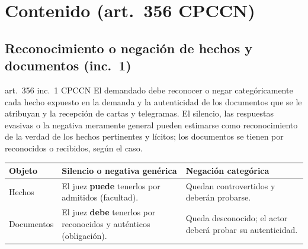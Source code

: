 \documentclass[12pt,oneside]{book}
\renewcommand{\arraystretch}{1.15}
\begin{document}
\section{Contenido (art.~356 CPCCN)}

\subsection{Reconocimiento o negación de hechos y documentos (inc.~1)}

\begin{norma}{art.~356 inc.~1 CPCCN}
El demandado debe reconocer o negar categóricamente cada hecho expuesto en la demanda y la autenticidad de los documentos que se le atribuyan y la recepción de cartas y telegramas. El silencio, las respuestas evasivas o la negativa meramente general pueden estimarse como reconocimiento de la verdad de los hechos pertinentes y lícitos; los documentos se tienen por reconocidos o recibidos, según el caso.
\end{norma}

\begin{table}[H]
\centering
\renewcommand{\arraystretch}{1.25}
\begin{tabularx}{\textwidth}{>{\RaggedRight\arraybackslash}p{}>{\RaggedRight\arraybackslash}X>{\RaggedRight\arraybackslash}X}
\toprule
\textbf{Objeto} & \textbf{Silencio o negativa genérica} & \textbf{Negación categórica} \\
\midrule
Hechos & El juez \textbf{puede} tenerlos por admitidos (facultad). & Quedan controvertidos y deberán probarse. \\
Documentos & El juez \textbf{debe} tenerlos por reconocidos y auténticos (obligación). & Queda desconocido; el actor deberá probar su autenticidad. \\
\bottomrule
\end{tabularx}
\end{table}
\end{document}
